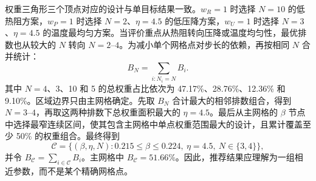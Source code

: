 \documentclass[withoutpreface,bwprint]{cumcmthesis}
\begin{document}
权重三角形三个顶点对应的设计与单目标结果一致。$w_R=1$ 时选择 $N=10$ 的低热阻方案，$w_P=1$ 时选择 $N=2$、$\eta=4.5$ 的低压降方案，$w_U=1$ 时选择 $N=3$、$\eta=4.5$ 的温度最均匀方案。当评价重点从热阻转向压降或温度均匀性，最优排数也从较大的 $N$ 转向 $N=2$--$4$。为减小单个网格点对步长的依赖，再按相同 $N$ 合并统计：
\begin{equation}
B_N=\sum_{i:N_i=N}B_i.
\end{equation}
其中 $N=4$、3、10 和 5 的总权重占比依次为 47.17\%、28.76\%、12.36\% 和 9.10\%。区域边界只由主网格确定。先取 $B_N$ 合计最大的相邻排数组合，得到 $N=3$--$4$，再取这两种排数下总权重面积最大的 $\eta=4.5$。最后从主网格的 $\beta$ 节点中选择最窄连续区间，使其包含主网格中单点权重范围最大的设计，且累计覆盖至少 50\% 的权重组合。最终得到
\begin{equation}
\mathcal C=\{(\beta,\eta,N):0.215\leq\beta\leq0.224,\ \eta=4.5,\ N\in\{3,4\}\},
\end{equation}
并令 $B_{\mathcal C}=\sum_{i\in\mathcal C}B_i$。主网格中 $B_{\mathcal C}=51.66\%$。因此，推荐结果应理解为一组相近参数，而不是某个精确网格点。
\end{document}
